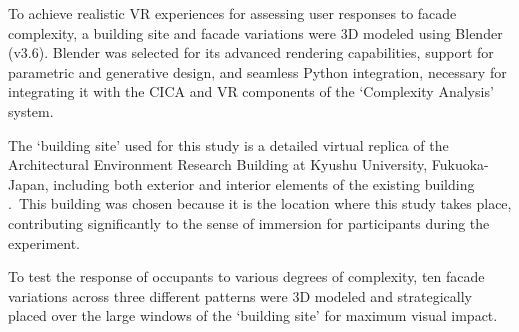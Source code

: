 %    



To achieve realistic VR experiences for assessing user responses to facade complexity, a building site and facade variations were 3D modeled using Blender (v3.6).
Blender was selected for its advanced rendering capabilities, support for parametric and generative design, and seamless Python integration, necessary for integrating it with the CICA and VR components of the `Complexity Analysis' system.

The `building site' used for this study is a detailed virtual replica of the Architectural Environment Research Building at Kyushu University, Fukuoka-Japan, including both exterior and interior elements of the existing building .~This building was chosen because it is the location where this study takes place, contributing significantly to the sense of immersion for participants during the experiment.

To test the response of occupants to various degrees of complexity, ten facade variations across three different patterns were 3D modeled and strategically placed over the large windows of the `building site' for maximum visual impact.



